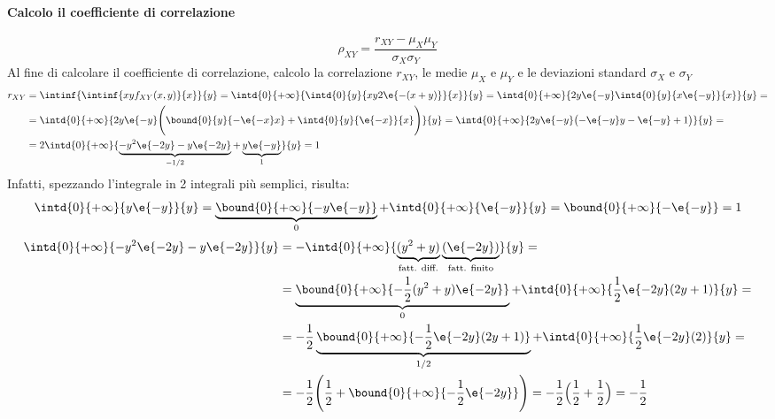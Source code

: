 \begin{esempio}
\paragraph{Calcolo il coefficiente di correlazione}
\[	
	\rho_{XY} = \frac{r_{XY} - \mu_X \mu_Y}{\sigma_X \sigma_Y}
\]
Al fine di calcolare il coefficiente di correlazione, calcolo la correlazione
$r_{XY}$, le medie $\mu_X$ e $\mu_Y$ e le deviazioni standard $\sigma_X$ e $\sigma_Y$
\begin{align*}
	r_{XY} &= \intinf{\intinf{xy f_{XY} (x,y)}{x}}{y} =
	\intd{0}{+\infty}{\intd{0}{y}{xy 2\e{-(x+y)}}{x}}{y} =
	\intd{0}{+\infty}{2y \e{-y} \intd{0}{y}{x \e{-y}}{x}}{y} = \\
	&= \intd{0}{+\infty}{2y\e{-y} \Biggl( \bound{0}{y}{-\e{-x}x} + \intd{0}{y}{\e{-x}}{x} \Biggr)}{y} =
	\intd{0}{+\infty}{2y\e{-y} \bigl(-\e{-y}y -\e{-y} +1\bigr)}{y} = \\
	&= 2\intd{0}{+\infty}{\underbrace{-y^2\e{-2y}-y\e{-2y}}_{- 1/2} + \underbrace{y\e{-y}}_1}{y} = 1
\end{align*}
Infatti, spezzando l'integrale in 2 integrali più semplici, risulta:
\[
	\intd{0}{+\infty}{y\e{-y}}{y} =
	\underbrace{\bound{0}{+\infty}{-y\e{-y}}}_0 + \intd{0}{+\infty}{\e{-y}}{y} =
	\bound{0}{+\infty}{-\e{-y}} = 1
\]
\begin{align*}
	\intd{0}{+\infty}{-y^2\e{-2y} -y\e{-2y}}{y} &= -\intd{0}{+\infty}{\underbrace{(y^2+y)}_{\text{fatt. diff.}} \underbrace{(\e{-2y})}_{\text{fatt. finito}}}{y} = \\
	&= \underbrace{\bound{0}{+\infty}{-\frac{1}{2}(y^2 +y)\e{-2y}}}_0 + \intd{0}{+\infty}{\frac{1}{2}\e{-2y}(2y+1)}{y} = \\
	&= -\frac{1}{2} \underbrace{\bound{0}{+\infty}{-\frac{1}{2}\e{-2y}(2y+1)}}_{1/2} + \intd{0}{+\infty}{\frac{1}{2}\e{-2y}(2)}{y} = \\
	&= -\frac{1}{2} \Biggl( \frac{1}{2} + \bound{0}{+\infty}{-\frac{1}{2}\e{-2y}} \Biggr) = -\frac{1}{2} \Bigl(\frac{1}{2} + \frac{1}{2}\Bigr) = -\frac{1}{2}
\end{align*}


\end{esempio}

